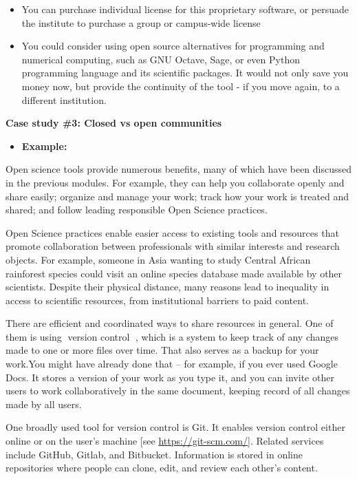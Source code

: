 \documentclass[
  letterpaper,
  DIV=11,
  numbers=noendperiod]{scrreport}
\providecommand{\tightlist}{%
  \setlength{\itemsep}{0pt}\setlength{\parskip}{0pt}}\usepackage{longtable,booktabs,array}
\begin{document}
\begin{itemize}
\tightlist
\item
  You can purchase individual license for this proprietary software, or
  persuade the institute to purchase a group or campus-wide license
\item
  You could consider using open source alternatives for programming and
  numerical computing, such as GNU Octave, Sage, or even Python
  programming language and its scientific packages. It would not only
  save you money now, but provide the continuity of the tool - if you
  move again, to a different institution.
\end{itemize}

\textbf{Case study \#3: Closed vs open communities}

\begin{itemize}
\tightlist
\item
  \textbf{Example:}
\end{itemize}

Open science tools provide numerous benefits, many of which have been
discussed in the previous modules. For example, they can help you
collaborate openly and share easily; organize and manage your work;
track how your work is treated and shared; and follow leading
responsible Open Science practices.

Open Science practices enable easier access to existing tools and
resources that promote collaboration between professionals with similar
interests and research objects. For example, someone in Asia wanting to
study Central African rainforest species could visit an online species
database made available by other scientists. Despite their physical
distance, many reasons lead to inequality in access to scientific
resources, from institutional barriers to paid content.

There are efficient and coordinated ways to share resources in general.
One of them is using {📖}version control {📖}, which is a system to keep
track of any changes made to one or more files over time. That also
serves as a backup for your work.You might have already done that -- for
example, if you ever used Google Docs. It stores a version of your work
as you type it, and you can invite other users to work collaboratively
in the same document, keeping record of all changes made by all users.

One broadly used tool for version control is Git. It enables version
control either online or on the user's machine {[}see
\url{https://git-scm.com/}{]}. Related services include GitHub, Gitlab,
and Bitbucket. Information is stored in online repositories where people
can clone, edit, and review each other's content.
\end{document}
